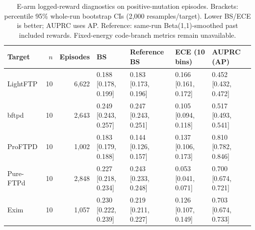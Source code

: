 \begin{table}[t]
\centering\footnotesize
\caption{E-arm logged-reward diagnostics on positive-mutation episodes. Brackets: percentile 95\% whole-run bootstrap CIs (2,000 resamples/target). Lower BS/ECE is better; AUPRC uses AP. Reference: same-run Beta(1,1)-smoothed past included rewards. Fixed-energy code-branch metrics remain unavailable.}
\label{tab:logged_calibration}
\begin{tabularx}{\textwidth}{l r r *{4}{>{\centering\arraybackslash}X}}
\toprule
Target & $n$ & Episodes & BS & Reference BS & ECE (10 bins) & AUPRC (AP) \\
\midrule
LightFTP & 10 & 6,622 & \shortstack{0.188\\{[0.178, 0.199]}} & \shortstack{0.183\\{[0.173, 0.196]}} & \shortstack{0.166\\{[0.161, 0.172]}} & \shortstack{0.452\\{[0.432, 0.472]}} \\
bftpd & 10 & 2,643 & \shortstack{0.249\\{[0.243, 0.257]}} & \shortstack{0.247\\{[0.243, 0.251]}} & \shortstack{0.105\\{[0.094, 0.118]}} & \shortstack{0.517\\{[0.493, 0.541]}} \\
ProFTPD & 10 & 1,002 & \shortstack{0.183\\{[0.179, 0.188]}} & \shortstack{0.144\\{[0.126, 0.157]}} & \shortstack{0.137\\{[0.106, 0.173]}} & \shortstack{0.810\\{[0.782, 0.846]}} \\
Pure-FTPd & 10 & 2,848 & \shortstack{0.227\\{[0.218, 0.234]}} & \shortstack{0.243\\{[0.233, 0.248]}} & \shortstack{0.053\\{[0.041, 0.071]}} & \shortstack{0.700\\{[0.674, 0.721]}} \\
Exim & 10 & 1,057 & \shortstack{0.230\\{[0.222, 0.239]}} & \shortstack{0.219\\{[0.211, 0.227]}} & \shortstack{0.126\\{[0.107, 0.149]}} & \shortstack{0.703\\{[0.674, 0.733]}} \\

\end{tabularx}
\end{table}
